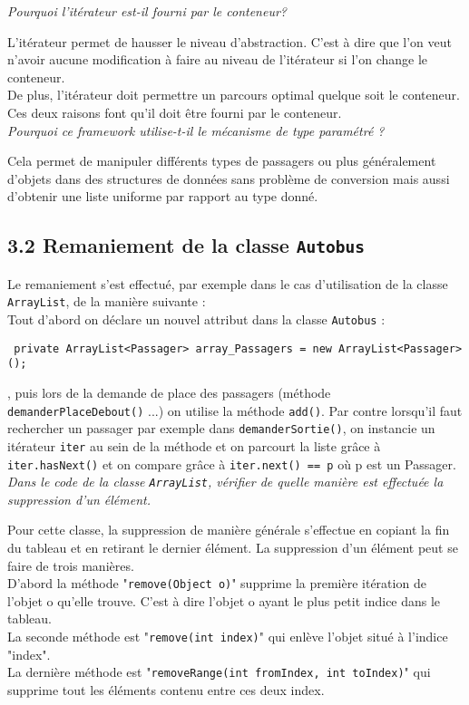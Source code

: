 \documentclass{article}
\begin{document}
\noindent \emph{Pourquoi l'itérateur est-il fourni par le conteneur?}

L'itérateur permet de hausser le niveau d'abstraction. C'est à dire que l'on veut n'avoir aucune modification à faire au niveau de l'itérateur si l'on change le conteneur.\\
De plus, l'itérateur doit permettre un parcours optimal quelque soit le conteneur.
Ces deux raisons font qu'il doit être fourni par le conteneur.\\

\noindent \emph{Pourquoi ce framework utilise-t-il le mécanisme de type paramétré ? }

Cela permet de manipuler différents types de passagers ou plus généralement d'objets dans des structures de données sans problème de conversion mais aussi d'obtenir une liste uniforme par rapport au type donné.


\subsection*{3.2 Remaniement de la classe \texttt{Autobus}}
Le remaniement s'est effectué, par exemple dans le cas d'utilisation de la classe \texttt{ArrayList}, de la manière suivante : \\
Tout d'abord on déclare un nouvel attribut dans la classe \texttt{Autobus} : \begin{verbatim}
 private ArrayList<Passager> array_Passagers = new ArrayList<Passager>();
\end{verbatim},
puis lors de la demande de place des passagers (méthode \texttt{demanderPlaceDebout()} ...) on utilise la méthode \texttt{add()}. Par contre lorsqu’il faut rechercher un passager par exemple dans \texttt{demanderSortie()}, on instancie un itérateur \texttt{iter} au sein de la méthode et on parcourt la liste grâce à \texttt{iter.hasNext()} et on compare grâce à \texttt{iter.next() == p} où p est un Passager.\\

\noindent \emph{Dans le code de la classe \texttt{ArrayList}, vérifier de quelle manière est effectuée la suppression d’un élément.}

Pour cette classe, la suppression de manière générale s'effectue en copiant la fin du tableau et en retirant le dernier élément.
La suppression d'un élément peut se faire de trois manières.\\
D'abord la méthode "\texttt{remove(Object o)}" supprime la première itération de l'objet o qu'elle trouve. C'est à dire l'objet o ayant le plus petit indice dans le tableau.\\
La seconde méthode est "\texttt{remove(int index)}" qui enlève l'objet situé à l'indice "index".\\
La dernière méthode est "\texttt{removeRange(int fromIndex, int toIndex)}" qui supprime tout les éléments contenu entre ces deux index.\\
\end{document}
